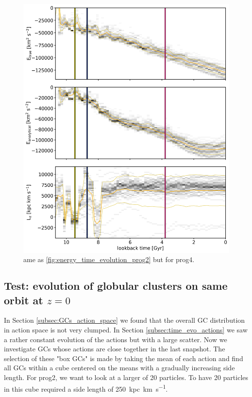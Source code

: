 \begin{figure}[htbp]
\captionsetup{format=plain}
    \centering
	\includegraphics[width=\textwidth]{plots/Dynamics/prog4/energy_time_evolution_hist_mean.png}
    \caption{ame as \ref{fig:energy_time_evolution_prog2} but for prog4.}\label{fig:energy_time_evolution_prog4}
\end{figure}
\fi

\subsection{Test: evolution of globular clusters on same orbit at $z=0$}\label{subsec:box_GCs}
In Section \ref{subsec:GCs_action_space} we found that the overall \ac{GC} distribution in action space is not very clumped. In Section \ref{subsec:time_evo_actions} we saw a rather constant evolution of the actions but with a large scatter. Now we investigate \acp{GC} whose actions are close together in the last snapshot. The selection of these "box \acp{GC}" is made by taking the mean of each action and find all \acp{GC} within a cube centered on the means with a gradually increasing side length. For prog2, we want to look at a larger of 20 particles. To have 20 particles in this cube required a side length of \SI{250}{kpc.km.s^{-1}}.  


